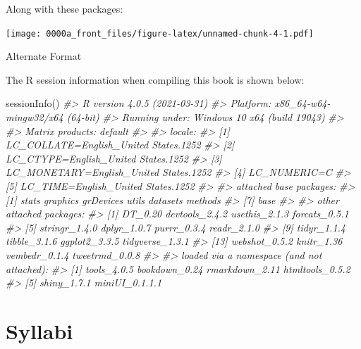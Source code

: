 \documentclass[
]{book}
\newenvironment{Shaded}{\begin{snugshade}}{\end{snugshade}}
\newcommand{\CommentTok}[1]{\textcolor[rgb]{0.56,0.35,0.01}{\textit{#1}}}
\newcommand{\FunctionTok}[1]{\textcolor[rgb]{0.00,0.00,0.00}{#1}}
\newcommand{\NormalTok}[1]{#1}
\begin{document}
Along with these packages:

\texttt{[image: 0000a\_front\_files/figure-latex/unnamed-chunk-4-1.pdf]}

Alternate Format

The R session information when compiling this book is shown below:

\begin{Shaded}
\begin{Highlighting}[]
\FunctionTok{sessionInfo}\NormalTok{()}
\CommentTok{\#\textgreater{} R version 4.0.5 (2021{-}03{-}31)}
\CommentTok{\#\textgreater{} Platform: x86\_64{-}w64{-}mingw32/x64 (64{-}bit)}
\CommentTok{\#\textgreater{} Running under: Windows 10 x64 (build 19043)}
\CommentTok{\#\textgreater{} }
\CommentTok{\#\textgreater{} Matrix products: default}
\CommentTok{\#\textgreater{} }
\CommentTok{\#\textgreater{} locale:}
\CommentTok{\#\textgreater{} [1] LC\_COLLATE=English\_United States.1252 }
\CommentTok{\#\textgreater{} [2] LC\_CTYPE=English\_United States.1252   }
\CommentTok{\#\textgreater{} [3] LC\_MONETARY=English\_United States.1252}
\CommentTok{\#\textgreater{} [4] LC\_NUMERIC=C                          }
\CommentTok{\#\textgreater{} [5] LC\_TIME=English\_United States.1252    }
\CommentTok{\#\textgreater{} }
\CommentTok{\#\textgreater{} attached base packages:}
\CommentTok{\#\textgreater{} [1] stats     graphics  grDevices utils     datasets  methods  }
\CommentTok{\#\textgreater{} [7] base     }
\CommentTok{\#\textgreater{} }
\CommentTok{\#\textgreater{} other attached packages:}
\CommentTok{\#\textgreater{}  [1] DT\_0.20         devtools\_2.4.2  usethis\_2.1.3   forcats\_0.5.1  }
\CommentTok{\#\textgreater{}  [5] stringr\_1.4.0   dplyr\_1.0.7     purrr\_0.3.4     readr\_2.1.0    }
\CommentTok{\#\textgreater{}  [9] tidyr\_1.1.4     tibble\_3.1.6    ggplot2\_3.3.5   tidyverse\_1.3.1}
\CommentTok{\#\textgreater{} [13] webshot\_0.5.2   knitr\_1.36      vembedr\_0.1.4   tweetrmd\_0.0.8 }
\CommentTok{\#\textgreater{} }
\CommentTok{\#\textgreater{} loaded via a namespace (and not attached):}
\CommentTok{\#\textgreater{} [1] tools\_4.0.5     bookdown\_0.24   rmarkdown\_2.11  htmltools\_0.5.2}
\CommentTok{\#\textgreater{} [5] shiny\_1.7.1     miniUI\_0.1.1.1}
\end{Highlighting}
\end{Shaded}

\hypertarget{part-syllabi}{%
\part*{Syllabi}\label{part-syllabi}}
\end{document}
